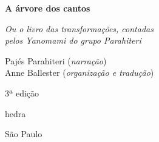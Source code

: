 




\begingroup\thispagestyle{empty}\vspace*{.05\textheight} 

              {\formular
              \huge
              \noindent
              \textbf{A árvore dos cantos}\\
              
              \vspace{-0.5cm}
              
              }

              \vspace{0.5cm}

              \noindent{}\textit{Ou o livro das transformações, contadas\\pelos Yanomami do  grupo Parahiteri}

              \vspace{1cm}
              

              \vfill              

              {\small
              \noindent{}Pajés Parahiteri (\textit{narração}) \vspace{0.2cm}\\
              \noindent{}Anne Ballester (\textit{organização e tradução})
              }

              \vspace{0.5cm}

              {\small\noindent{}3ª edição}

              \vfill

              \newfontfamily{}
              {\noindent\fontsize{30}{40}\selectfont \timesnewroman hedra}

              {\selectfont\small\noindent São Paulo \quad\the\year}

\endgroup
\pagebreak
